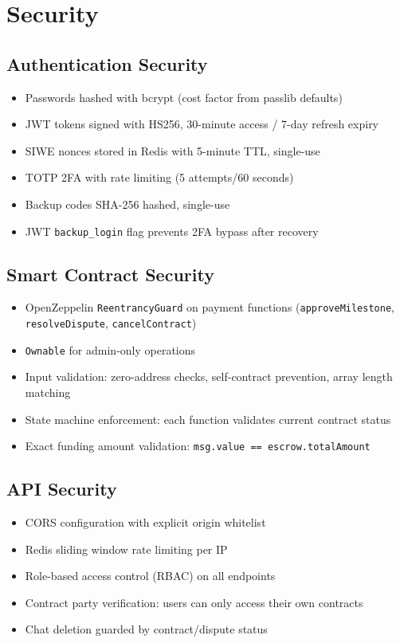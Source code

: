 \documentclass[12pt,a4paper]{article}
\begin{document}
\section{Security}

\subsection{Authentication Security}
\begin{itemize}[nosep]
    \item Passwords hashed with bcrypt (cost factor from passlib defaults)
    \item JWT tokens signed with HS256, 30-minute access / 7-day refresh expiry
    \item SIWE nonces stored in Redis with 5-minute TTL, single-use
    \item TOTP 2FA with rate limiting (5 attempts/60 seconds)
    \item Backup codes SHA-256 hashed, single-use
    \item JWT \texttt{backup\_login} flag prevents 2FA bypass after recovery
\end{itemize}

\subsection{Smart Contract Security}
\begin{itemize}[nosep]
    \item OpenZeppelin \texttt{ReentrancyGuard} on payment functions (\texttt{approveMilestone}, \texttt{resolveDispute}, \texttt{cancelContract})
    \item \texttt{Ownable} for admin-only operations
    \item Input validation: zero-address checks, self-contract prevention, array length matching
    \item State machine enforcement: each function validates current contract status
    \item Exact funding amount validation: \texttt{msg.value == escrow.totalAmount}
\end{itemize}

\subsection{API Security}
\begin{itemize}[nosep]
    \item CORS configuration with explicit origin whitelist
    \item Redis sliding window rate limiting per IP
    \item Role-based access control (RBAC) on all endpoints
    \item Contract party verification: users can only access their own contracts
    \item Chat deletion guarded by contract/dispute status
\end{itemize}
\end{document}
